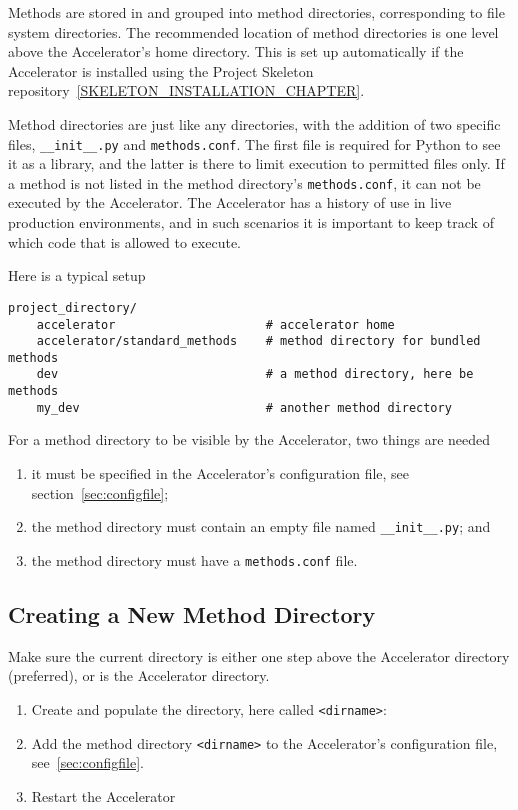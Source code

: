 Methods are stored in and grouped into method directories,
corresponding to file system directories.  The recommended location of
method directories is one level above the Accelerator's home
directory.  This is set up automatically if the Accelerator is
installed using the Project Skeleton repository~\ref{SKELETON_INSTALLATION_CHAPTER}.

Method directories are just like any directories, with the addition of
two specific files, \texttt{\_\_init\_\_.py} and \texttt{methods.conf}.
The first file is required for Python to see it as a library, and the
latter is there to limit execution to permitted files only.  If a
method is not listed in the method directory's \texttt{methods.conf},
it can not be executed by the Accelerator.  The Accelerator has a
history of use in live production environments, and in such scenarios
it is important to keep track of which code that is allowed to
execute.

Here is a typical setup
\begin{verbatim}
project_directory/
    accelerator                     # accelerator home
    accelerator/standard_methods    # method directory for bundled methods
    dev                             # a method directory, here be methods
    my_dev                          # another method directory
\end{verbatim}
For a method directory to be visible by the Accelerator, two things are needed
\begin{enumerate}
\item it must be specified in the Accelerator's configuration file,
  see section~\ref{sec:configfile};
\item the method directory must contain an empty file named
  \texttt{\_\_init\_\_.py}; and
\item the method directory must have a \texttt{methods.conf} file.
\end{enumerate}

\subsection*{Creating a New Method Directory}
Make sure the current directory is either one step above the
Accelerator directory (preferred), or is the Accelerator directory.
\begin{enumerate}
\item Create and populate the directory, here called \texttt{<dirname>}:
  \begin{shell}
  \end{shell}
\item Add the method directory \texttt{<dirname>} to the Accelerator's
  configuration file, see~\ref{sec:configfile}.
\item Restart the Accelerator
\end{enumerate}


